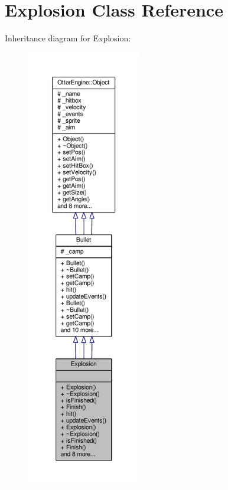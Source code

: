 \hypertarget{class_explosion}{}\section{Explosion Class Reference}
\label{class_explosion}


Inheritance diagram for Explosion\+:\nopagebreak
\begin{figure}[H]
\begin{center}
\leavevmode
\includegraphics[height=550pt]{d0/d99/class_explosion__inherit__graph}
\end{center}
\end{figure}


